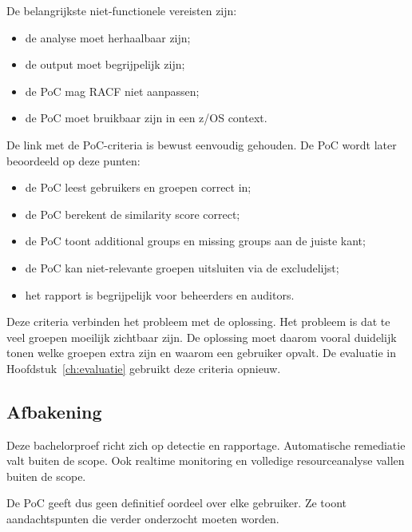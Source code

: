 De belangrijkste niet-functionele vereisten zijn:

\begin{itemize}
	\item de analyse moet herhaalbaar zijn;
	\item de output moet begrijpelijk zijn;
	\item de PoC mag RACF niet aanpassen;
	\item de PoC moet bruikbaar zijn in een z/OS context.
\end{itemize}

De link met de PoC-criteria is bewust eenvoudig gehouden. De PoC wordt later beoordeeld op deze punten:

\begin{itemize}
	\item de PoC leest gebruikers en groepen correct in;
	\item de PoC berekent de similarity score correct;
	\item de PoC toont additional groups en missing groups aan de juiste kant;
	\item de PoC kan niet-relevante groepen uitsluiten via de excludelijst;
	\item het rapport is begrijpelijk voor beheerders en auditors.
\end{itemize}

Deze criteria verbinden het probleem met de oplossing. Het probleem is dat te veel groepen moeilijk zichtbaar zijn. De oplossing moet daarom vooral duidelijk tonen welke groepen extra zijn en waarom een gebruiker opvalt. De evaluatie in Hoofdstuk~\ref{ch:evaluatie} gebruikt deze criteria opnieuw.

\subsection*{Afbakening}

Deze bachelorproef richt zich op detectie en rapportage. Automatische remediatie valt buiten de scope. Ook realtime monitoring en volledige resourceanalyse vallen buiten de scope.

De PoC geeft dus geen definitief oordeel over elke gebruiker. Ze toont aandachtspunten die verder onderzocht moeten worden.
